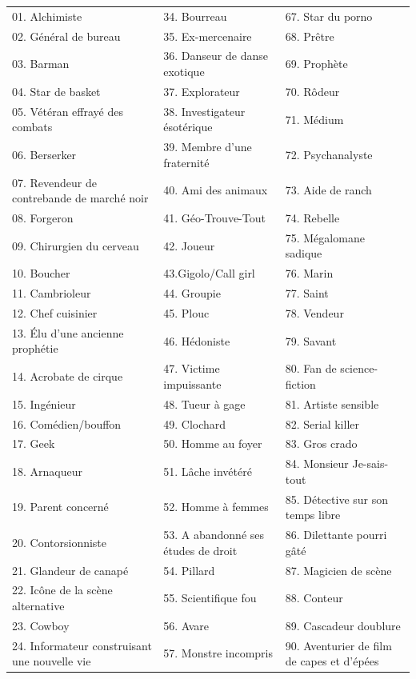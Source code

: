 \begin{frame}[b]
\begin{tabular}{p{5.55cm}p{5.55cm}p{5.55cm}}
01. Alchimiste & 34. Bourreau & 67. Star du porno \\
02. Général de bureau & 35. Ex-mercenaire & 68. Prêtre \\
03. Barman & 36. Danseur de danse exotique & 69. Prophète \\
04. Star de basket & 37. Explorateur & 70. Rôdeur \\
05. Vétéran effrayé des combats & 38. Investigateur ésotérique & 71. Médium \\
06. Berserker & 39. Membre d'une fraternité & 72. Psychanalyste \\
07. Revendeur de contrebande de marché noir & 40. Ami des animaux & 73. Aide de ranch \\
08. Forgeron & 41. Géo-Trouve-Tout & 74. Rebelle \\
09. Chirurgien du cerveau & 42. Joueur & 75. Mégalomane sadique \\
10. Boucher & 43.Gigolo/Call girl & 76. Marin \\
11. Cambrioleur & 44. Groupie & 77. Saint \\
12. Chef cuisinier & 45. Plouc & 78. Vendeur \\
13. Élu d'une ancienne prophétie & 46. Hédoniste & 79. Savant \\
14. Acrobate de cirque & 47. Victime impuissante & 80. Fan de science-fiction \\
15. Ingénieur & 48. Tueur à gage & 81. Artiste sensible \\
16. Comédien/bouffon & 49. Clochard & 82. Serial killer \\
17. Geek & 50. Homme au foyer & 83. Gros crado \\
18. Arnaqueur & 51. Lâche invétéré & 84. Monsieur Je-sais-tout \\
19. Parent concerné & 52. Homme à femmes & 85. Détective sur son temps libre \\
20. Contorsionniste & 53. A abandonné ses études de droit & 86. Dilettante pourri gâté \\
21. Glandeur de canapé & 54. Pillard & 87. Magicien de scène \\
22. Icône de la scène alternative & 55. Scientifique fou & 88. Conteur \\
23. Cowboy & 56. Avare & 89. Cascadeur doublure \\
24. Informateur construisant une nouvelle vie & 57. Monstre incompris & 90. Aventurier de film de capes et d'épées \\

\end{tabular}
\end{frame}
